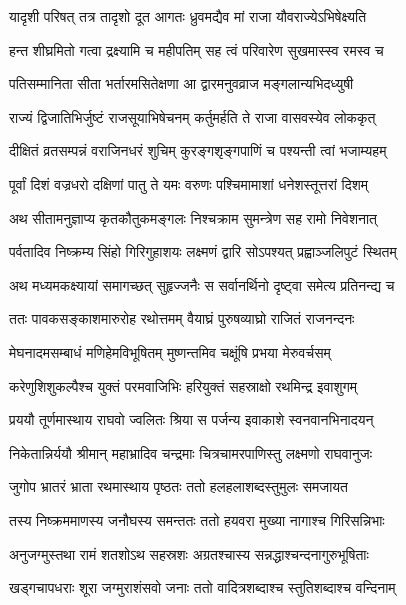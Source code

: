 \twolineshloka
{यादृशी परिषत् तत्र तादृशो दूत आगतः}
{ध्रुवमद्यैव मां राजा यौवराज्येऽभिषेक्ष्यति} %

\twolineshloka
{हन्त शीघ्रमितो गत्वा द्रक्ष्यामि च महीपतिम्}
{सह त्वं परिवारेण सुखमास्स्व रमस्व च} %

\twolineshloka
{पतिसम्मानिता सीता भर्तारमसितेक्षणा}
{आ द्वारमनुवव्राज मङ्गलान्यभिदध्युषी} %

\twolineshloka
{राज्यं द्विजातिभिर्जुष्टं राजसूयाभिषेचनम्}
{कर्तुमर्हति ते राजा वासवस्येव लोककृत्} %

\twolineshloka
{दीक्षितं व्रतसम्पन्नं वराजिनधरं शुचिम्}
{कुरङ्गशृङ्गपाणिं च पश्यन्ती त्वां भजाम्यहम्} %

\twolineshloka
{पूर्वां दिशं वज्रधरो दक्षिणां पातु ते यमः}
{वरुणः पश्चिमामाशां धनेशस्तूत्तरां दिशम्} %

\twolineshloka
{अथ सीतामनुज्ञाप्य कृतकौतुकमङ्गलः}
{निश्चक्राम सुमन्त्रेण सह रामो निवेशनात्} %

\twolineshloka
{पर्वतादिव निष्क्रम्य सिंहो गिरिगुहाशयः}
{लक्ष्मणं द्वारि सोऽपश्यत् प्रह्वाञ्जलिपुटं स्थितम्} %

\twolineshloka
{अथ मध्यमकक्ष्यायां समागच्छत् सुहृज्जनैः}
{स सर्वानर्थिनो दृष्ट्वा समेत्य प्रतिनन्द्य च} %

\twolineshloka
{ततः पावकसङ्काशमारुरोह रथोत्तमम्}
{वैयाघ्रं पुरुषव्याघ्रो राजितं राजनन्दनः} %

\twolineshloka
{मेघनादमसम्बाधं मणिहेमविभूषितम्}
{मुष्णन्तमिव चक्षूंषि प्रभया मेरुवर्चसम्} %

\twolineshloka
{करेणुशिशुकल्पैश्च युक्तं परमवाजिभिः}
{हरियुक्तं सहस्राक्षो रथमिन्द्र इवाशुगम्} %

\twolineshloka
{प्रययौ तूर्णमास्थाय राघवो ज्वलितः श्रिया}
{स पर्जन्य इवाकाशे स्वनवानभिनादयन्} %

\twolineshloka
{निकेतान्निर्ययौ श्रीमान् महाभ्रादिव चन्द्रमाः}
{चित्रचामरपाणिस्तु लक्ष्मणो राघवानुजः} %

\twolineshloka
{जुगोप भ्रातरं भ्राता रथमास्थाय पृष्ठतः}
{ततो हलहलाशब्दस्तुमुलः समजायत} %

\twolineshloka
{तस्य निष्क्रममाणस्य जनौघस्य समन्ततः}
{ततो हयवरा मुख्या नागाश्च गिरिसन्निभाः} %

\twolineshloka
{अनुजग्मुस्तथा रामं शतशोऽथ सहस्रशः}
{अग्रतश्चास्य सन्नद्धाश्चन्दनागुरुभूषिताः} %

\twolineshloka
{खड्गचापधराः शूरा जग्मुराशंसवो जनाः}
{ततो वादित्रशब्दाश्च स्तुतिशब्दाश्च वन्दिनाम्} %

